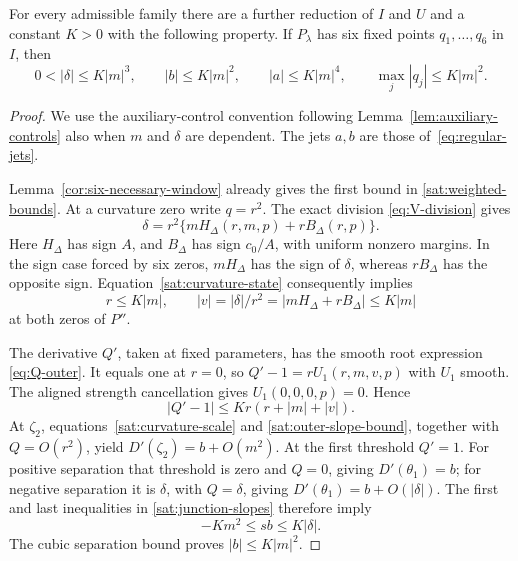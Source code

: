 \begin{proposition}
\label{sat:weighted-confinement}
For every admissible family there are a further reduction of \(I\) and
\(U\) and a constant \(K>0\) with the following property. If \(P_\lambda\)
has six fixed points \(q_1,\ldots,q_6\) in \(I\), then
\begin{equation}\label{sat:weighted-bounds}
 0<|\delta|\le K|m|^3,\qquad
 |b|\le K|m|^2,\qquad |a|\le K|m|^4,\qquad
 \max_j|q_j|\le K|m|^2.
\end{equation}
\end{proposition}

\begin{proof}
We use the auxiliary-control convention following
Lemma~\ref{lem:auxiliary-controls} also when \(m\) and \(\delta\) are dependent.
The jets \(a,b\) are those of~\eqref{eq:regular-jets}.

Lemma~\ref{cor:six-necessary-window} already gives the first
bound in \eqref{sat:weighted-bounds}. At a curvature zero write
\(q=r^2\). The exact division \eqref{eq:V-division} gives
\begin{equation}\label{sat:curvature-state}
 \delta=r^2\{mH_\Delta(r,m,p)+rB_\Delta(r,p)\}.
\end{equation}
Here \(H_\Delta\) has sign \(A\), and \(B_\Delta\) has sign \(c_0/A\),
with uniform nonzero margins. In the sign case forced by six zeros,
\(mH_\Delta\) has the sign of \(\delta\), whereas \(rB_\Delta\) has the
opposite sign. Equation~\eqref{sat:curvature-state} consequently
implies
\begin{equation}\label{sat:curvature-scale}
 r\le K|m|,\qquad
 |v|=|\delta|/r^2=|mH_\Delta+rB_\Delta|\le K|m|
\end{equation}
at both zeros of \(P''\).

The derivative \(Q'\), taken at fixed parameters,
has the smooth root expression \eqref{eq:Q-outer}. It equals one
at \(r=0\), so \(Q'-1=rU_1(r,m,v,p)\) with \(U_1\) smooth.
The aligned strength cancellation gives \(U_1(0,0,0,p)=0\).
Hence
\begin{equation}\label{sat:outer-slope-bound}
 |Q'-1|\le K r(r+|m|+|v|).
\end{equation}
At \(\zeta_2\), equations~\eqref{sat:curvature-scale} and
\eqref{sat:outer-slope-bound}, together with \(Q=O(r^2)\), yield
\(D'(\zeta_2)=b+O(m^2)\). At the first threshold \(Q'=1\).
For positive separation that threshold is zero and \(Q=0\), giving
\(D'(\theta_1)=b\); for negative separation it is \(\delta\), with
\(Q=\delta\), giving \(D'(\theta_1)=b+O(|\delta|)\).
The first and last inequalities in \eqref{sat:junction-slopes}
therefore imply
\[
 -Km^2\le sb\le K|\delta|.
\]
The cubic separation bound proves \(|b|\le K|m|^2\).


\end{proof}
